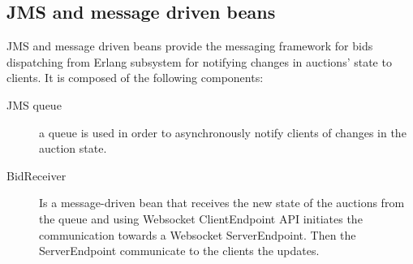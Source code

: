 \subsection{JMS and message driven beans}\label{subsec:archjms}

JMS and message driven beans provide the messaging framework for bids
dispatching from Erlang subsystem for notifying changes in auctions’ state to
clients. It is composed of the following components:

\begin{description}
	\item[JMS queue] a queue is used in order to asynchronously notify
		clients of changes in the auction state.
	\item[BidReceiver] Is a message-driven bean that receives the new state
		of the auctions from the queue and using Websocket
		ClientEndpoint API initiates the communication towards a
		Websocket ServerEndpoint. Then the ServerEndpoint communicate to
		the clients the updates.
\end{description}
